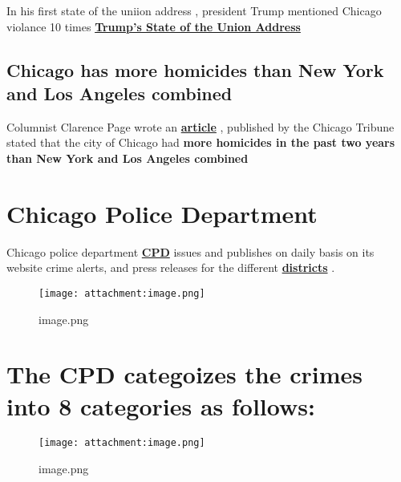 \documentclass[11pt]{article}
\makeatletter
\def\maxwidth{\ifdim\Gin@nat@width>\linewidth\linewidth
    \else\Gin@nat@width\fi}
\let\Oldincludegraphics\includegraphics
\renewcommand{\includegraphics}[1]{\Oldincludegraphics[width=.8\maxwidth]{#1}}
\makeatother
\begin{document}
    In his first state of the uniion address , president Trump mentioned
Chicago violance 10 times
\textbf{\href{http://www.chicagotribune.com/news/local/breaking/ct-trump-tweets-quotes-chicago-htmlstory.html}{Trump's
State of the Union Address}}

    \hypertarget{chicago-has-more-homicides-than-new-york-and-los-angeles-combined}{%
\subsection{Chicago has more homicides than New York and Los Angeles
combined}\label{chicago-has-more-homicides-than-new-york-and-los-angeles-combined}}

    Columnist Clarence Page wrote an
\textbf{\href{http://www.chicagotribune.com/news/opinion/page/ct-perspec-page-trump-murder-rate-jeff-sessions-0103-20180102-story.html}{article}}
, published by the Chicago Tribune stated that the city of Chicago had
\textbf{more homicides in the past two years than New York and Los
Angeles combined}

    \hypertarget{chicago-police-department}{%
\section{Chicago Police Department}\label{chicago-police-department}}

Chicago police department
\textbf{\href{https://home.chicagopolice.org/community/districts/11th-district-harrison/}{CPD}}
issues and publishes on daily basis on its website crime alerts, and
press releases for the different
\textbf{\href{https://home.chicagopolice.org/community/districts/}{districts}}
.

    \begin{figure}
\centering
\texttt{[image: attachment:image.png]}
\caption{image.png}
\end{figure}

    \hypertarget{the-cpd-categoizes-the-crimes-into-8-categories-as-follows}{%
\section{The CPD categoizes the crimes into 8 categories as
follows:}\label{the-cpd-categoizes-the-crimes-into-8-categories-as-follows}}

\begin{figure}
\centering
\texttt{[image: attachment:image.png]}
\caption{image.png}
\end{figure}
\end{document}
